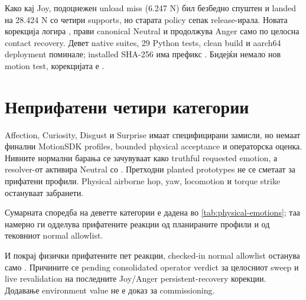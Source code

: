 Како кај Joy, подоцнежен unload miss (6.247 N) бил безбедно спуштен и landed на
28.424 N со четири supports, но старата policy сепак release-ирала. Новата
корекција логира , прави canonical
Neutral и продолжува Anger само по целосна contact recovery. Девет native
suites, 29 Python tests, clean build и aarch64 deployment поминале; installed
SHA-256 има префикс . Бидејќи немало нов motion test,
корекцијата е .

\section{Неприфатени четири категории}

Affection, Curiosity, Disgust и Surprise имаат специфицирани замисли, но немаат
финални MotionSDK profiles, bounded physical acceptance и операторска оценка.
Нивните нормални барања се зачувуваат како truthful requested emotion, а
resolver-от активира Neutral со
. Претходни planted prototypes не се
сметаат за прифатени профили. Physical airborne hop, yaw, locomotion и torque
strike остануваат забранети.

Сумарната споредба на деветте категории е дадена во
\cref{tab:physical-emotions}; таа намерно ги одделува прифатените реакции од
планираните профили и од тековниот normal allowlist.



И покрај физички прифатените пет реакции, checked-in normal allowlist останува
само . Причините се pending consolidated operator verdict за
целосниот sweep и live revalidation на последните Joy/Anger persistent-recovery
корекции. Додавање environment value не е доказ за commissioning.
